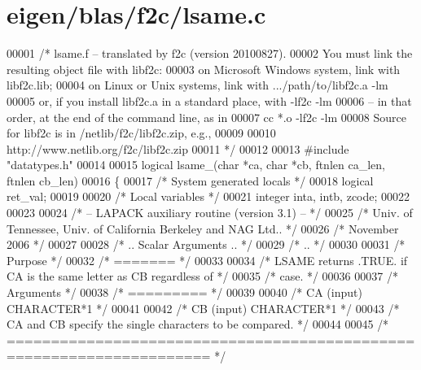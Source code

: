 \hypertarget{eigen_2blas_2f2c_2lsame_8c_source}{}\section{eigen/blas/f2c/lsame.c}
\label{eigen_2blas_2f2c_2lsame_8c_source}

\begin{DoxyCode}
00001 \textcolor{comment}{/* lsame.f -- translated by f2c (version 20100827).}
00002 \textcolor{comment}{   You must link the resulting object file with libf2c:}
00003 \textcolor{comment}{    on Microsoft Windows system, link with libf2c.lib;}
00004 \textcolor{comment}{    on Linux or Unix systems, link with .../path/to/libf2c.a -lm}
00005 \textcolor{comment}{    or, if you install libf2c.a in a standard place, with -lf2c -lm}
00006 \textcolor{comment}{    -- in that order, at the end of the command line, as in}
00007 \textcolor{comment}{        cc *.o -lf2c -lm}
00008 \textcolor{comment}{    Source for libf2c is in /netlib/f2c/libf2c.zip, e.g.,}
00009 \textcolor{comment}{}
00010 \textcolor{comment}{        http://www.netlib.org/f2c/libf2c.zip}
00011 \textcolor{comment}{*/}
00012 
00013 \textcolor{preprocessor}{#include "datatypes.h"}
00014 
00015 logical lsame\_(\textcolor{keywordtype}{char} *ca, \textcolor{keywordtype}{char} *cb, ftnlen ca\_len, ftnlen cb\_len)
00016 \{
00017     \textcolor{comment}{/* System generated locals */}
00018     logical ret\_val;
00019 
00020     \textcolor{comment}{/* Local variables */}
00021     integer inta, intb, zcode;
00022 
00023 
00024 \textcolor{comment}{/*  -- LAPACK auxiliary routine (version 3.1) -- */}
00025 \textcolor{comment}{/*     Univ. of Tennessee, Univ. of California Berkeley and NAG Ltd.. */}
00026 \textcolor{comment}{/*     November 2006 */}
00027 
00028 \textcolor{comment}{/*     .. Scalar Arguments .. */}
00029 \textcolor{comment}{/*     .. */}
00030 
00031 \textcolor{comment}{/*  Purpose */}
00032 \textcolor{comment}{/*  ======= */}
00033 
00034 \textcolor{comment}{/*  LSAME returns .TRUE. if CA is the same letter as CB regardless of */}
00035 \textcolor{comment}{/*  case. */}
00036 
00037 \textcolor{comment}{/*  Arguments */}
00038 \textcolor{comment}{/*  ========= */}
00039 
00040 \textcolor{comment}{/*  CA      (input) CHARACTER*1 */}
00041 
00042 \textcolor{comment}{/*  CB      (input) CHARACTER*1 */}
00043 \textcolor{comment}{/*          CA and CB specify the single characters to be compared. */}
00044 
00045 \textcolor{comment}{/* ===================================================================== */}

\end{DoxyCode}
